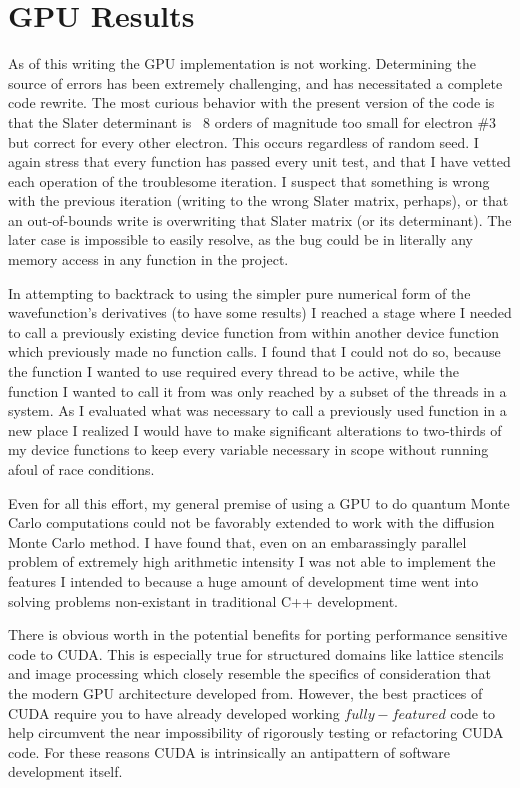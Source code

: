 \documentclass[11pt, conference, compsocconf]{IEEEtran}
\begin{document}
\section{GPU Results}
As of this writing the GPU implementation is not working. Determining the source of errors has been extremely challenging, and has necessitated a complete code rewrite. The most curious behavior with the present version of the code is that the Slater determinant is ~8 orders of magnitude too small for electron \#3 but correct for every other electron. This occurs regardless of random seed. I again stress that every function has passed every unit test, and that I have vetted each operation of the troublesome iteration. I suspect that something is wrong with the previous iteration (writing to the wrong Slater matrix, perhaps), or that an out-of-bounds write is overwriting that Slater matrix (or its determinant). The later case is impossible to easily resolve, as the bug could be in literally any memory access in any function in the project. 

In attempting to backtrack to using the simpler pure numerical form of the wavefunction's derivatives (to have some results) I reached a stage where I needed to call a previously existing device function from within another device function which previously made no function calls. I found that I could not do so, because the function I wanted to use required every thread to be active, while the function I wanted to call it from was only reached by a subset of the threads in a system. As I evaluated what was necessary to call a previously used function in a new place I realized I would have to make significant alterations to two-thirds of my device functions to keep every variable necessary in scope without running afoul of race conditions.

Even for all this effort, my general premise of using a GPU to do quantum Monte Carlo computations could not be favorably extended to work with the diffusion Monte Carlo method. I have found that, even on an embarassingly parallel problem of extremely high arithmetic intensity I was not able to implement the features I intended to because a huge amount of development time went into solving problems non-existant in traditional C++ development.

There is obvious worth in the potential benefits for porting performance sensitive code to CUDA. This is especially true for structured domains like lattice stencils and image processing which closely resemble the specifics of consideration that the modern GPU architecture developed from. However, the best practices of CUDA require you to have already developed working $fully-featured$ code to help circumvent the near impossibility of rigorously testing or refactoring CUDA code. For these reasons CUDA is intrinsically an antipattern of software development itself.
\end{document}
